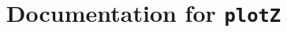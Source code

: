 \documentclass{article}
\title{Documentation for \texttt{plotZ}}
\begin{document}
\maketitle

\begin{figure}[h!]
  \begin{center}
  \end{center}
\end{figure}

\begin{figure}[h!]
  \begin{center}
  \end{center}
\end{figure}
\end{document}
